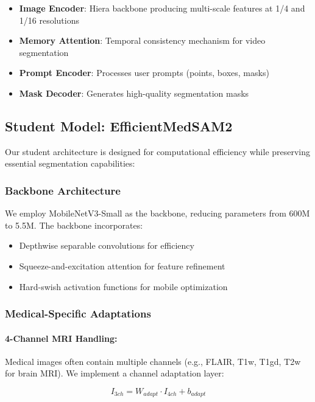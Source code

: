 \documentclass[conference]{IEEEtran}
\begin{document}
\begin{itemize}
    \item \textbf{Image Encoder}: Hiera backbone producing multi-scale features at 1/4 and 1/16 resolutions
    \item \textbf{Memory Attention}: Temporal consistency mechanism for video segmentation
    \item \textbf{Prompt Encoder}: Processes user prompts (points, boxes, masks)
    \item \textbf{Mask Decoder}: Generates high-quality segmentation masks
\end{itemize}

\subsection{Student Model: EfficientMedSAM2}

Our student architecture is designed for computational efficiency while preserving essential segmentation capabilities:

\subsubsection{Backbone Architecture}
We employ MobileNetV3-Small as the backbone, reducing parameters from 600M to 5.5M. The backbone incorporates:
\begin{itemize}
    \item Depthwise separable convolutions for efficiency
    \item Squeeze-and-excitation attention for feature refinement
    \item Hard-swish activation functions for mobile optimization
\end{itemize}

\subsubsection{Medical-Specific Adaptations}

\paragraph{4-Channel MRI Handling:} Medical images often contain multiple channels (e.g., FLAIR, T1w, T1gd, T2w for brain MRI). We implement a channel adaptation layer:

\begin{equation}
I_{3ch} = W_{adapt} \cdot I_{4ch} + b_{adapt}
\end{equation}
\end{document}
